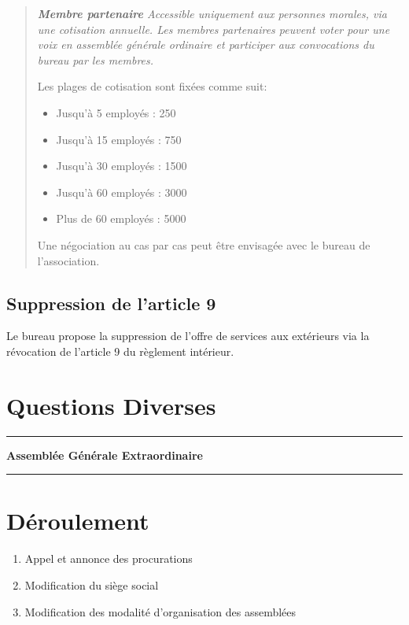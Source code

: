 \documentclass[11pt]{article}
\begin{document}
\begin{quote}
\itshape
\textbf{Membre partenaire}
Accessible uniquement aux personnes morales, via une cotisation annuelle.
Les membres partenaires peuvent voter pour une voix en assemblée
générale ordinaire et participer aux convocations du bureau par les membres.

Les plages de cotisation sont fixées comme suit:
\begin{itemize}
    \item Jusqu'à 5 employés : 250\officialeuro
    \item Jusqu'à 15 employés : 750\officialeuro
    \item Jusqu'à 30 employés : 1500\officialeuro
    \item Jusqu'à 60 employés : 3000\officialeuro
    \item Plus de 60 employés : 5000\officialeuro
\end{itemize}

Une négociation au cas par cas peut être envisagée avec le bureau de l'association.
\end{quote}

\subsection{Suppression de l'article 9}

Le bureau propose la suppression de l'offre de services aux extérieurs via la révocation de l'article 9 du règlement intérieur.

\section{Questions Diverses}

\newpage

\hrule
\vspace{.3cm}
\begin{center}
\Large\bfseries Assemblée Générale Extraordinaire
\end{center}
\vspace{.3cm}
\hrule

\vspace{1.5cm}

\section*{Déroulement}

\begin{enumerate}
    \item Appel et annonce des procurations
    \item Modification du siège social
	\item Modification des modalité d’organisation des assemblées
\end{enumerate}
\end{document}
